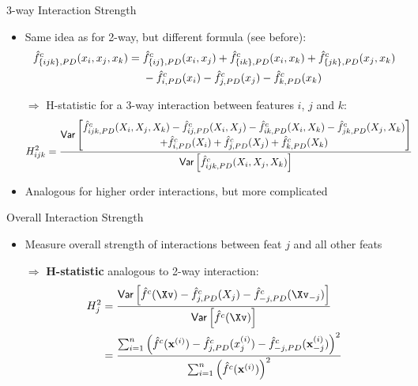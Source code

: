 \documentclass[10pt,compress,t,notes=noshow, xcolor=table]{beamer}
\begin{document}
\begin{frame}{3-way Interaction Strength}
\begin{itemize}
    \item Same idea as for 2-way, but different formula (see before): %
    \begin{align*}
        \hat{f}^c_{\{ijk\}, PD}(x_i, x_j, x_k)
        =\; & \hat{f}^c_{\{ij\}, PD}(x_i, x_j) + \hat{f}^c_{\{ik\}, PD}(x_i, x_k) + \hat{f}^c_{\{jk\}, PD}(x_j, x_k) \\
        & - \hat{f}^c_{i, PD}(x_i) - \hat{f}^c_{j, PD}(x_j) - \hat{f}^c_{k, PD}(x_k)
    \end{align*}
    \item[$\Rightarrow$] H-statistic for a 3-way interaction between features $i$, $j$ and $k$:
    \begin{align*}
        H^2_{ijk}
        & = \frac{ \mathsf{Var} \left[ \substack{\textstyle
        \hat{f}^c_{ijk, PD}(X_i, X_j, X_k)
        - \hat{f}^c_{ij, PD}(X_i, X_j) - \hat{f}^c_{ik, PD}(X_i, X_k) - \hat{f}^c_{jk, PD}(X_j, X_k) \\ \textstyle
        + \hat{f}^c_{i, PD}(X_i) + \hat{f}^c_{j, PD}(X_j) + \hat{f}^c_{k, PD}(X_k)
        }
        \right]
        }{ \mathsf{Var} \left[ \hat{f}^c_{ijk, PD}(X_i, X_j, X_k) \right] }
    \end{align*}
    \item Analogous for higher order interactions, but more complicated
\end{itemize}
\end{frame}



\begin{frame}{Overall Interaction Strength}

\begin{itemize}
    \item Measure overall strength of interactions between feat $j$ and all other feats
    \item[$\Rightarrow$] \textbf{H-statistic} analogous to 2-way interaction:
    \begin{align*}
        H^2_{j}
        & = \frac{
            \var \left[ \fh^c(\Xv) - \fh^c_{j, PD}(X_j) - \fh^c_{-j, PD}(\Xv_{-j}) \right]
        }{ \var \left[ \fh^c(\Xv) \right] } \\
        & = \frac{
            \sum_{i=1}^n \left( \fh^c(\xv^{(i)}) - \fh^c_{j, PD}(x_j^{(i)}) - \fh^c_{-j, PD}(\xv_{-j}^{(i)})  \right)^2
        }{
            \sum_{i=1}^n \left( \fh^c(\xv^{(i)}) \right)^2
        }
    \end{align*}
\end{itemize}


\end{frame}
\end{document}
